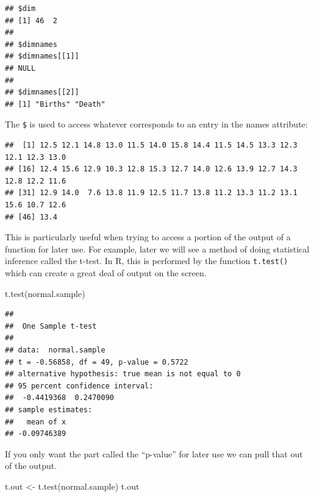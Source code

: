 \documentclass[
]{book}
\newenvironment{Shaded}{\begin{snugshade}}{\end{snugshade}}
\newcommand{\FunctionTok}[1]{\textcolor[rgb]{0.00,0.00,0.00}{#1}}
\newcommand{\NormalTok}[1]{#1}
\newcommand{\OtherTok}[1]{\textcolor[rgb]{0.56,0.35,0.01}{#1}}
\newcommand{\SpecialCharTok}[1]{\textcolor[rgb]{0.00,0.00,0.00}{#1}}
\begin{document}
\begin{verbatim}
## $dim
## [1] 46  2
## 
## $dimnames
## $dimnames[[1]]
## NULL
## 
## $dimnames[[2]]
## [1] "Births" "Death"
\end{verbatim}

The \texttt{\$} is used to access whatever corresponds to an entry in the names attribute:

\begin{Shaded}
\end{Shaded}

\begin{verbatim}
##  [1] 12.5 12.1 14.8 13.0 11.5 14.0 15.8 14.4 11.5 14.5 13.3 12.3 12.1 12.3 13.0
## [16] 12.4 15.6 12.9 10.3 12.8 15.3 12.7 14.0 12.6 13.9 12.7 14.3 12.8 12.2 11.6
## [31] 12.9 14.0  7.6 13.8 11.9 12.5 11.7 13.8 11.2 13.3 11.2 13.1 15.6 10.7 12.6
## [46] 13.4
\end{verbatim}

This is particularly useful when trying to access a portion of the output of a function for later use. For example, later we will see a method of doing statistical inference called the t-test. In R, this is performed by the function \texttt{t.test()} which can create a great deal of output on the screen.

\begin{Shaded}
\begin{Highlighting}[]
\FunctionTok{t.test}\NormalTok{(normal.sample)}
\end{Highlighting}
\end{Shaded}

\begin{verbatim}
## 
##  One Sample t-test
## 
## data:  normal.sample
## t = -0.56858, df = 49, p-value = 0.5722
## alternative hypothesis: true mean is not equal to 0
## 95 percent confidence interval:
##  -0.4419368  0.2470090
## sample estimates:
##   mean of x 
## -0.09746389
\end{verbatim}

If you only want the part called the ``p-value'' for later use we can pull that out of the output.

\begin{Shaded}
\begin{Highlighting}[]
\NormalTok{t.out }\OtherTok{\textless{}{-}} \FunctionTok{t.test}\NormalTok{(normal.sample)}
\NormalTok{t.out}
\end{Highlighting}
\end{Shaded}
\end{document}
